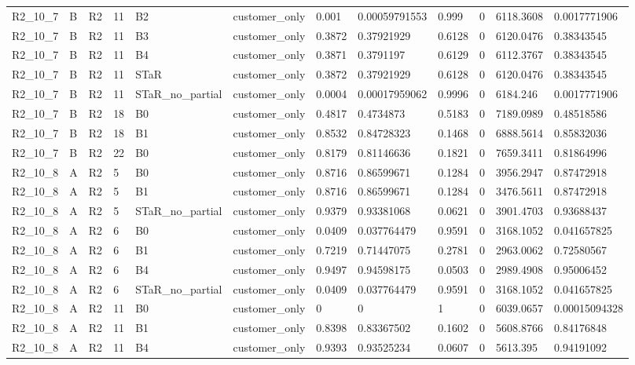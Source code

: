 \begin{longtable}{llllllllllll}
R2\_10\_7 & B & R2 & 11 & B2 & customer\_only & 0.001 & 0.00059791553 & 0.999 & 0 & 6118.3608 & 0.0017771906 \\
R2\_10\_7 & B & R2 & 11 & B3 & customer\_only & 0.3872 & 0.37921929 & 0.6128 & 0 & 6120.0476 & 0.38343545 \\
R2\_10\_7 & B & R2 & 11 & B4 & customer\_only & 0.3871 & 0.3791197 & 0.6129 & 0 & 6112.3767 & 0.38343545 \\
R2\_10\_7 & B & R2 & 11 & STaR & customer\_only & 0.3872 & 0.37921929 & 0.6128 & 0 & 6120.0476 & 0.38343545 \\
R2\_10\_7 & B & R2 & 11 & STaR\_no\_partial & customer\_only & 0.0004 & 0.00017959062 & 0.9996 & 0 & 6184.246 & 0.0017771906 \\
R2\_10\_7 & B & R2 & 18 & B0 & customer\_only & 0.4817 & 0.4734873 & 0.5183 & 0 & 7189.0989 & 0.48518586 \\
R2\_10\_7 & B & R2 & 18 & B1 & customer\_only & 0.8532 & 0.84728323 & 0.1468 & 0 & 6888.5614 & 0.85832036 \\
R2\_10\_7 & B & R2 & 22 & B0 & customer\_only & 0.8179 & 0.81146636 & 0.1821 & 0 & 7659.3411 & 0.81864996 \\
R2\_10\_8 & A & R2 & 5 & B0 & customer\_only & 0.8716 & 0.86599671 & 0.1284 & 0 & 3956.2947 & 0.87472918 \\
R2\_10\_8 & A & R2 & 5 & B1 & customer\_only & 0.8716 & 0.86599671 & 0.1284 & 0 & 3476.5611 & 0.87472918 \\
R2\_10\_8 & A & R2 & 5 & STaR\_no\_partial & customer\_only & 0.9379 & 0.93381068 & 0.0621 & 0 & 3901.4703 & 0.93688437 \\
R2\_10\_8 & A & R2 & 6 & B0 & customer\_only & 0.0409 & 0.037764479 & 0.9591 & 0 & 3168.1052 & 0.041657825 \\
R2\_10\_8 & A & R2 & 6 & B1 & customer\_only & 0.7219 & 0.71447075 & 0.2781 & 0 & 2963.0062 & 0.72580567 \\
R2\_10\_8 & A & R2 & 6 & B4 & customer\_only & 0.9497 & 0.94598175 & 0.0503 & 0 & 2989.4908 & 0.95006452 \\
R2\_10\_8 & A & R2 & 6 & STaR\_no\_partial & customer\_only & 0.0409 & 0.037764479 & 0.9591 & 0 & 3168.1052 & 0.041657825 \\
R2\_10\_8 & A & R2 & 11 & B0 & customer\_only & 0 & 0 & 1 & 0 & 6039.0657 & 0.00015094328 \\
R2\_10\_8 & A & R2 & 11 & B1 & customer\_only & 0.8398 & 0.83367502 & 0.1602 & 0 & 5608.8766 & 0.84176848 \\
R2\_10\_8 & A & R2 & 11 & B4 & customer\_only & 0.9393 & 0.93525234 & 0.0607 & 0 & 5613.395 & 0.94191092 \\

\end{longtable}
